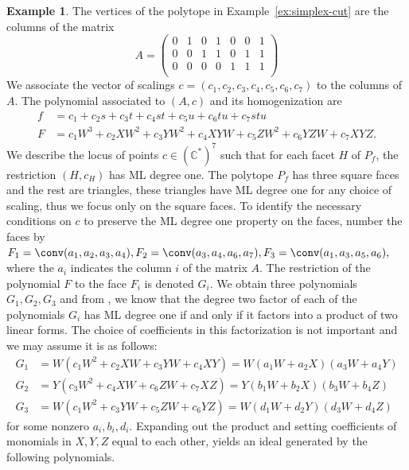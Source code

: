 \documentclass[12pt,reqno]{amsart}   	%
\theoremstyle{plain}
\theoremstyle{definition}
\newtheorem{example}[theorem]{Example}
\theoremstyle{remark}
\begin{document}
\begin{example} \label{ex:cube-simplex}
The vertices of the polytope in Example~\ref{ex:simplex-cut}
are the columns of the matrix
\[
    A=\begin{pmatrix}
         0& 1& 0& 1& 0& 0& 1\\
         0& 0& 1& 1& 0& 1& 1\\
         0& 0& 0& 0& 1& 1& 1\\
    \end{pmatrix}
    \]
     We associate the vector of scalings $c=(c_1,c_2,c_3,c_4,c_5,c_6,c_7)$ to the columns of $A$.
     The polynomial associated to $(A,c)$ and its homogenization are \begin{align*}
        f&=c_1+c_2s +c_3t+c_4st+c_5u+c_6tu+c_7stu \\
        F&=c_1W^3+c_2XW^2 +c_3YW^2+c_4XYW+c_5ZW^2+c_6YZW+c_7XYZ.
    \end{align*}
We describe the locus of points $c\in(\mathbb{C}^{\ast})^7$ such that for each facet $H$ of $P_f$, the restriction
    $(H,c_{H})$ has ML degree one. The polytope $P_f$ has three square faces and the rest are triangles, these triangles
    have ML degree one for any choice of scaling, thus we focus only on the square faces. To identify the necessary conditions on $c$ to preserve the ML degree one property on the faces, number the faces by
    $
        F_1=\conv(a_1,a_2,a_3,a_4),
        F_2=\conv(a_3,a_4,a_6,a_7),
        F_3= \conv(a_1,a_3,a_5,a_6),
  $
    where the $a_i$ indicates the column $i$ of the matrix $A$. The restriction of the polynomial $F$ to the face $F_i$
    is denoted $G_i$. We obtain three polynomials $G_1,G_2,G_3$ and
    from \cite{vonBothmer2010}, we know that the degree two factor of each of the polynomials $G_i$ has ML degree one if and only if it factors into a product of two linear forms. The choice of coefficients in this
    factorization is not important and we may assume it is as follows:
    \begin{align*}
        G_1&=W(c_1W^2+c_2XW+c_3YW+c_4XY)=W(a_1W+a_2X)(a_3W+a_4Y)\\
        G_2&=Y(c_3W^2+c_4XW+c_6ZW+c_7XZ)=Y(b_1W+b_2X)(b_3W+b_4Z) \\
        G_3&=W(c_1W^2+c_3YW+c_5ZW+c_6YZ)=W(d_1W+d_2Y)(d_3W+d_4Z)
    \end{align*}
for some nonzero $a_i,b_i,d_i$. Expanding out the product and setting coefficients of monomials in $X,Y,Z$ equal to each
other, yields an ideal generated by the following polynomials.
\begin{align*}

\end{align*}
\end{example}
\end{document}
